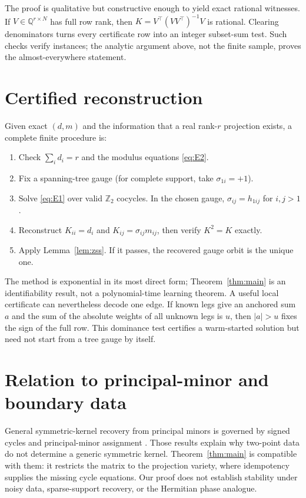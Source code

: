 \documentclass[11pt,a4paper]{article}
\theoremstyle{definition}
\theoremstyle{remark}
\begin{document}
The proof is qualitative but constructive enough to yield exact rational witnesses.  If
$V\in\mathbb Q^{r\times N}$ has full row rank, then
$K=V^\top(VV^\top)^{-1}V$ is rational.  Clearing denominators turns every certificate row
into an integer subset-sum test.  Such checks verify instances; the analytic argument above,
not the finite sample, proves the almost-everywhere statement.

\section{Certified reconstruction}

Given exact $(d,m)$ and the information that a real rank-$r$ projection exists, a complete
finite procedure is:
\begin{enumerate}
\item Check $\sum_i d_i=r$ and the modulus equations \eqref{eq:E2}.
\item Fix a spanning-tree gauge (for complete support, take $\sigma_{1i}=+1$).
\item Solve \eqref{eq:E1} over valid $\mathbb Z_2$ cocycles.  In the chosen gauge,
      $\sigma_{ij}=h_{1ij}$ for $i,j>1$.
\item Reconstruct $K_{ii}=d_i$ and $K_{ij}=\sigma_{ij}m_{ij}$, then verify $K^2=K$ exactly.
\item Apply Lemma~\ref{lem:zss}.  If it passes, the recovered gauge orbit is the unique one.
\end{enumerate}
The method is exponential in its most direct form; Theorem~\ref{thm:main} is an
identifiability result, not a polynomial-time learning theorem.  A useful local certificate
can nevertheless decode one edge.  If known legs give an anchored sum $a$ and the sum of
the absolute weights of all unknown legs is $u$, then $|a|>u$ fixes the sign of the full
row.  This dominance test certifies a warm-started solution but need not start from a tree
gauge by itself.

\section{Relation to principal-minor and boundary data}

General symmetric-kernel recovery from principal minors is governed by signed cycles and
principal-minor assignment \citep{HoltzSturmfels2007,GriffinTsatsomeros2006,
UrschelEtAl2017,Brunel2018,BrunelUrschel2024}.  Those results explain why two-point data do
not determine a generic symmetric kernel.  Theorem~\ref{thm:main} is compatible with them:
it restricts the matrix to the projection variety, where idempotency supplies the missing
cycle equations.  Our proof does not establish stability under noisy data, sparse-support
recovery, or the Hermitian phase analogue.
\end{document}
